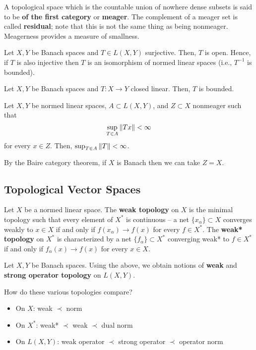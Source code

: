 \documentclass[11pt]{article}
\begin{document}
A topological space which is the countable union of nowhere dense subsets is said to be \textbf{of the first category} or \textbf{meager}. The complement of a meager set is called \textbf{residual}; note that this is not the same thing as being nonmeager. Meagerness provides a measure of smallness.

\begin{theorem}
Let $X,Y$ be Banach spaces and $T\in L(X,Y)$ surjective. Then, $T$ is open. Hence, if $T$ is also injective then $T$ is an isomorphism of normed linear spaces (i.e., $T^{-1}$ is bounded).
\end{theorem}

\begin{theorem}
Let $X,Y$ be Banach spaces and $T: X\to Y$ closed linear. Then, $T$ is bounded.
\end{theorem}

\begin{theorem}
Let $X,Y$ be normed linear spaces, $A\subset L(X,Y)$, and $Z\subset X$ nonmeager such that
$$\sup_{T\in A}\left\lVert Tx\right\rVert<\infty$$
for every $x\in Z$. Then, $\sup_{T\in A}\left\lVert T\right\rVert<\infty$.
\end{theorem}

By the Baire category theorem, if $X$ is Banach then we can take $Z=X$.

\subsection{Topological Vector Spaces}
\begin{definition}
Let $X$ be a normed linear space. The \textbf{weak topology} on $X$ is the minimal topology such that every element of $X^*$ is continuous -- a net $\{x_{\alpha}\}\subset X$ converges weakly to $x\in X$ if and only if $f(x_{\alpha})\to f(x)$ for every $f\in X^*$. The \textbf{weak* topology} on $X^*$ is characterized by a net $\{f_{\alpha}\}\subset X^*$ converging weak* to $f\in X^*$ if and only if $f_{\alpha}(x)\to f(x)$ for every $x\in X$. 
\end{definition}

Let $X,Y$ be Banach spaces. Using the above, we obtain notions of \textbf{weak} and \textbf{strong operator topology} on $L(X,Y)$.

\begin{remark}
How do these various topologies compare?
\begin{itemize}
\item On $X$: weak $\prec$ norm
\item On $X^*$: weak* $\prec$ weak $\prec$ dual norm
\item On $L(X,Y)$: weak operator $\prec$ strong operator $\prec$ operator norm
\end{itemize}
\end{remark}
\end{document}
